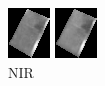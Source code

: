 \documentclass[a4paper,12pt]{article}  %
\begin{document}
\begin{figure}[H]
    \centering
    \begin{minipage}{0.24\textwidth}
        \centering
        \includegraphics[width=\linewidth]{spektralne/nir_budynek3.png}
        \caption*{NIR}
    \end{minipage}
    \begin{minipage}{0.24\textwidth}
        \centering
        \includegraphics[width=\linewidth]{spektralne/red_budynek3.png}

\end{minipage}
\end{figure}
\end{document}
